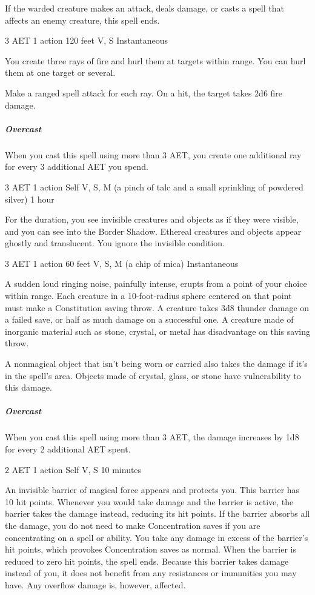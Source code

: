 If the warded creature makes an attack, deals damage, or casts a spell that affects an enemy creature, this spell ends.


{3 AET}
{1 action}
{120 feet}
{V, S}
{Instantaneous}

You create three rays of fire and hurl them at targets within range. You can hurl them at one target or several.

Make a ranged spell attack for each ray. On a hit, the target takes 2d6 fire damage.

\subparagraph*{Overcast} When you cast this spell using more than 3 AET, you create one additional ray for every 3 additional AET you spend.


{3 AET}
{1 action}
{Self}
{V, S, M (a pinch of talc and a small sprinkling of powdered silver)}
{1 hour}

For the duration, you see invisible creatures and objects as if they were visible, and you can see into the Border Shadow. Ethereal creatures and objects appear ghostly and translucent. You ignore the invisible condition.


{3 AET}
{1 action}
{60 feet}
{V, S, M (a chip of mica)}
{Instantaneous}

A sudden loud ringing noise, painfully intense, erupts from a point of your choice within range. Each creature in a 10-foot-radius sphere centered on that point must make a Constitution saving throw. A creature takes 3d8 thunder damage on a failed save, or half as much damage on a successful one. A creature made of inorganic material such as stone, crystal, or metal has disadvantage on this saving throw.

A nonmagical object that isn't being worn or carried also takes the damage if it's in the spell's area. Objects made of crystal, glass, or stone have vulnerability to this damage.

\subparagraph*{Overcast} When you cast this spell using more than 3 AET, the damage increases by 1d8 for every 2 additional AET spent.


{2 AET}
{1 action}
{Self}
{V, S}
{10 minutes}

An invisible barrier of magical force appears and protects you. This barrier has 10 hit points. Whenever you would take damage and the barrier is active, the barrier takes the damage instead, reducing its hit points. If the barrier absorbs all the damage, you do not need to make Concentration saves if you are concentrating on a spell or ability. You take any damage in excess of the barrier's hit points, which provokes Concentration saves as normal. When the barrier is reduced to zero hit points, the spell ends. Because this barrier takes damage instead of you, it does not benefit from any resistances or immunities you may have. Any overflow damage is, however, affected.

